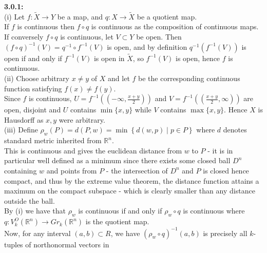 \documentclass[a4paper]{article}
\begin{document}
    \textbf{3.0.1:}\\
    (i) Let $f  \colon \tilde{X} \to Y$ be a map, and 
    $q  \colon X \to \tilde{X}$ be a quotient map.\\
    If $f$ is continuous then
    $f \circ q$ is continuous as the composition of continuous
    maps.\\
    If conversely $f \circ q$ is continuous, let
    $V \subset Y$ be open. Then
     $\left( f \circ q \right)^{-1}(V) = 
     q^{-1} \circ f^{-1}(V)$ is open, and
     by definition $q^{-1}\left( f^{-1}(V) \right) $ is
     open if and only if $f^{-1}(V)$ is open
     in $\tilde{X}$, so $f^{-1}(V)$ is open, hence
     $f$ is continuous.\\
     \linebreak
     (ii) 
     Choose arbitrary $x \neq y$ of $X$ and let
     $f$ be the corresponding continuous function satisfying
     $f(x)\neq f(y)$. \\
     Since $f$ is continuous, 
     $U = f^{-1}\left( (-\infty, \frac{x+y}{2} ) \right) $ 
     and $ V = f^{-1}\left( \left( \frac{x+y}{2}, \infty \right)  \right) $ 
     are open, disjoint and 
     $U$ contains $\min \{x,y\}$ while
     $V$ contains $\max \{x,y\}$. Hence
     $X$ is Hausdorff as $x,y$ were arbitrary.\\
     \linebreak
     (iii) Define
     $\rho_{w} (P)
     = d(P,w) =  \min \left\{ d(w,p) \mid p \in P \right\}  $
     where $d$ denotes standard metric
     inherited from $\mathbb{R}^{n}$.\\
     This is continuous and gives the euclidean distance
     from $w$ to $P$ - it is in particular well defined as
     a minimum since there exists some
     closed ball $D^{n}$ containing
     $w$ and points from $P$ - the intersection of
     $D^{n}$ and $P$ is closed hence compact, and 
     thus by the extreme value theorem, the distance function
     attains a maximum on the compact subspace - which is clearly
     smaller than any distance outside the ball.\\
     By (i) we have that
     $\rho_w$ is continuous if and only if
     $\rho_w \circ q$ is continuous where $q  \colon
     V_{k}^{O} \left( \mathbb{R}^{n} \right) 
     \to Gr_{k}\left( \mathbb{R}^{n} \right) $ is the
     quotient map.\\
     Now, for any interval
     $\left( a,b \right) \subset R$, we have
     $\left( \rho_w \circ q \right)^{-1}
     \left( a,b \right) $ is precisely
     all $k$-tuples of northonormal vectors in
\end{document}
